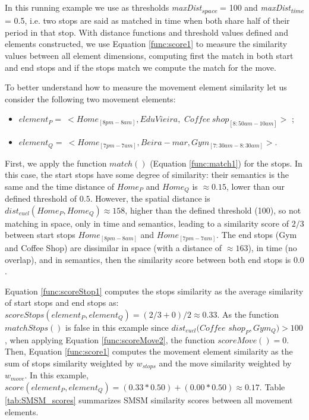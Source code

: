 \documentclass[12pt]{article}
\begin{document}
In this running example we use as thresholds \textit{maxDist\textsubscript{space}} = 100  and \textit{maxDist\textsubscript{time}} = 0.5, i.e. two stops are said as matched in time when both share half of their period in that stop.
With distance functions and threshold values defined and elements constructed, we use Equation \ref{func:score1} to measure the similarity values between all element dimensions, computing first the match in both start and end stops and if the stops match we compute the match for the move. 

To better understand how to measure the movement element similarity let us consider  the following two movement elements: 
\begin{itemize}

\item $element_{P}=\ <Home_{[8pm-8am]}, Edu Vieira,$ $Coffee\ shop_{[8:50am-10am]}>$ ;
\item $element_{Q}=\ <Home_{[7pm-7am]}, Beira-mar, Gym_{[7:30am-8:30am]}>$. 
\end{itemize}
First, we apply the function $match()$ (Equation \ref{func:match1}) for the stops. In this case, the start stops have some degree of similarity: their semantics is the same and the time distance of $Home_{P}$ and $Home_{Q}$ is $\approx 0.15$, lower than our defined threshold of $0.5$. However, the spatial distance is $dist_{eucl}(Home_{P}, Home_{Q}) \approx 158 $, higher than the defined threshold (100), so not matching in space, only in time and semantics, leading to a similarity score of $2/3$ between start stops $Home_{[8pm-8am]}$ and $Home_{[7pm-7am]}$. The end stops (Gym and Coffee Shop) are dissimilar in space (with a distance of $\approx 163$), in time (no overlap), and in semantics, then the similarity score between both end stops is $0.0$.

 Equation \ref{func:scoreStop1} computes the stops similarity as the average similarity of start stops  and end stops as: $scoreStops(element_{P}, element_{Q}) = (2/3 + 0) / 2 \approx 0.33$.
 As the function $matchStops()$ is false in this example since $dist_{eucl}(Coffee$ $shop_{P}, Gym_{Q}) > 100$, when applying Equation \ref{func:scoreMove2}, the function %
$scoreMove()=0$. Then, Equation \ref{func:score1} computes the movement element similarity as the sum of stops similarity weighted by $w_{stops}$ and the move similarity weighted by $w_{move}$. In this example, $score(element_{P}, element_{Q}) = (0.33 * 0.50) + (0.00 * 0.50) \approx 0.17$. Table \ref{tab:SMSM_scores} summarizes SMSM similarity scores between all movement elements.
\end{document}
